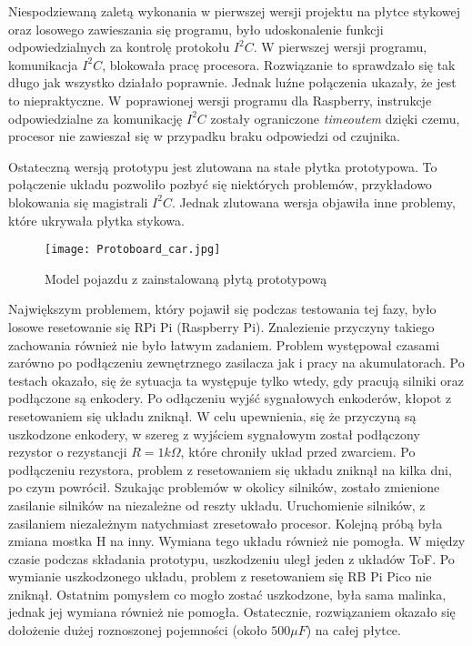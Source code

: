         Niespodziewaną zaletą wykonania w pierwszej wersji projektu na płytce stykowej oraz losowego zawieszania się programu, było udoskonalenie funkcji odpowiedzialnych za kontrolę protokołu $I^2C$.
        W pierwszej wersji programu, komunikacja $I^2C$, blokowała pracę procesora.
        Rozwiązanie to sprawdzało się tak długo jak wszystko działało poprawnie.
        Jednak luźne połączenia ukazały, że jest to niepraktyczne.
        W poprawionej wersji programu dla Raspberry, instrukcje odpowiedzialne za komunikację $I^2C$ zostały ograniczone \textit{timeoutem} dzięki czemu, procesor nie zawieszał się w przypadku braku odpowiedzi od czujnika.

        Ostateczną wersją prototypu jest zlutowana na stałe płytka prototypowa.
        To połączenie układu pozwoliło pozbyć się niektórych problemów, przykładowo blokowania się magistrali $I^2C$.
        Jednak zlutowana wersja objawiła inne problemy, które ukrywała płytka stykowa.
        \begin{figure}[!ht]
            \centering
            \texttt{[image: Protoboard\_car.jpg]}
            \caption{Model pojazdu z zainstalowaną płytą prototypową}
            \label{fig:protoboard_car}
        \end{figure}

        Największym problemem, który pojawił się podczas testowania tej fazy, było losowe resetowanie się RPi Pi (Raspberry Pi).
        Znalezienie przyczyny takiego zachowania również nie było łatwym zadaniem.
        Problem występował czasami zarówno po podłączeniu zewnętrznego zasilacza jak i pracy na akumulatorach.
        Po testach okazało, się że sytuacja ta występuje tylko wtedy, gdy pracują silniki oraz podłączone są enkodery.
        Po odłączeniu wyjść sygnałowych enkoderów, kłopot z resetowaniem się układu zniknął.
        W celu upewnienia, się że przyczyną są uszkodzone enkodery, w szereg z wyjściem sygnałowym został podłączony rezystor o rezystancji $R =1k\Omega$, które chroniły układ przed zwarciem.
        Po podłączeniu rezystora, problem z resetowaniem się układu zniknął na kilka dni, po czym powrócił.
        Szukając problemów w okolicy silników, zostało zmienione zasilanie silników na niezależne od reszty układu.
        Uruchomienie silników, z zasilaniem niezależnym natychmiast zresetowało procesor.
        Kolejną próbą była zmiana mostka H na inny. Wymiana tego układu również nie pomogła.
        W między czasie podczas składania prototypu, uszkodzeniu uległ jeden z układów ToF.
        Po wymianie uszkodzonego układu, problem z resetowaniem się RB Pi Pico nie zniknął.
        Ostatnim pomysłem co mogło zostać uszkodzone, była sama malinka, jednak jej wymiana również nie pomogła.
        Ostatecznie, rozwiązaniem okazało się dołożenie dużej roznoszonej pojemności (około $500\mu F$) na całej płytce.

